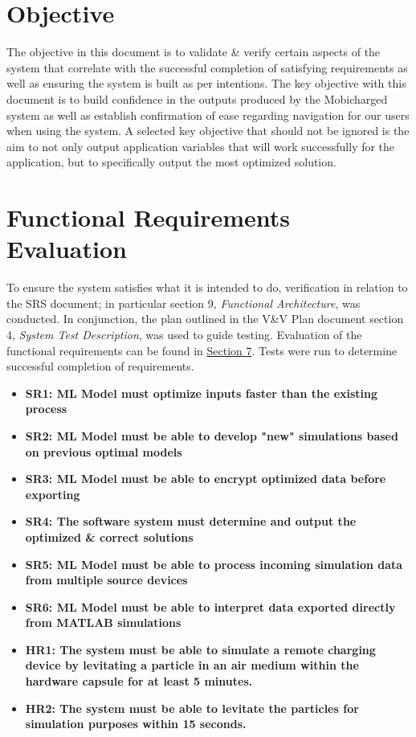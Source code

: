 \documentclass[12pt, titlepage]{article}
\begin{document}
\section{Objective}
The objective in this document is to validate \& verify certain aspects of the system that correlate with the successful completion of satisfying requirements as well as ensuring the system is built as per intentions. The key objective with this document is to build confidence in the outputs produced by the Mobicharged system as well as establish confirmation of ease regarding navigation for our users when using the system. A selected key objective that should not be ignored is the aim to not only output application variables that will work successfully for the application, but to specifically output the most optimized solution.

\section{Functional Requirements Evaluation}
To ensure the system satisfies what it is intended to do, verification in relation to the SRS document; in particular section 9, \emph{Functional Architecture}, was conducted. In conjunction, the plan outlined in the V\&V Plan document section 4, \emph{System Test Description}, was used to guide testing. Evaluation of the functional requirements can be found in \hyperlink{Section5Anchor}{Section 7}. Tests were run to determine successful completion of requirements. 

\begin{center}
    \begin{itemize}
        \item \textbf{SR1: ML Model must optimize inputs faster than the existing process}
        \item \textbf{SR2: ML Model must be able to develop "new" simulations based on previous optimal models}
        \item \textbf{SR3: ML Model must be able to encrypt optimized data before exporting}
        \item \textbf{SR4: The software system must determine and output the optimized \& correct solutions}
        \item \textbf{SR5: ML Model must be able to process incoming simulation data from multiple source devices}
        \item \textbf{SR6: ML Model must be able to interpret data exported directly from MATLAB simulations}
        \item \textbf{HR1: The system must be able to simulate a remote charging device by levitating a particle in an air medium within the hardware capsule for at least 5 minutes.}
        \item \textbf{HR2: The system must be able to levitate the particles for simulation purposes within 15 seconds.}
    \end{itemize}
\end{center}
\end{document}
